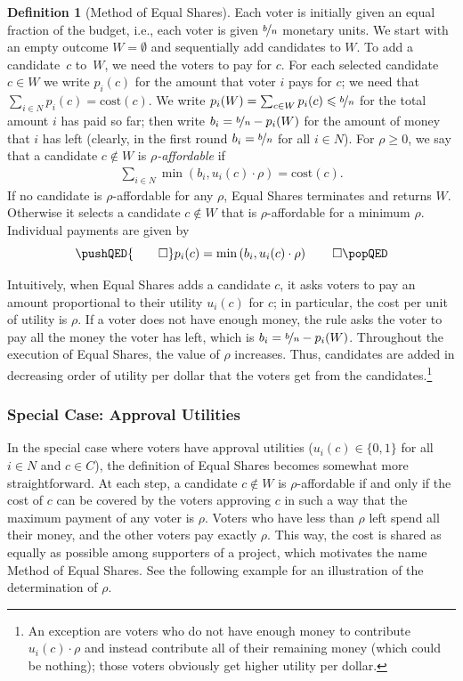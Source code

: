 \documentclass[10pt]{scrartcl}
\renewcommand*{\le}{\leqslant}
\renewcommand*{\ge}{\geqslant}
\newcommand{\cost}{{{\mathrm{cost}}}}
\theoremstyle{definition}
\newtheorem{definition}{Definition}
\theoremstyle{plain}
\begin{document}
\begin{definition}[Method of Equal Shares]\label{def:rulex}
	Each voter is initially given an equal fraction of the budget, i.e., each voter is given $\nicefrac{b}{n}$ monetary units. 
	We start with an empty outcome $W = \emptyset$ and sequentially add candidates to $W$. To add a candidate~$c$ to~$W$, we need the voters to pay for $c$. For each selected candidate $c \in W$ we write $p_i(c)$ for the amount that voter $i$ pays for $c$; we need that $\sum_{i \in N} p_i(c) = \cost(c)$. We write $p_i(W) = \sum_{c \in W} p_i(c) \le \nicefrac{b}{n}$ for the total amount $i$ has paid so far; then write $b_i = \nicefrac{b}{n} - p_i(W)$ for the amount of money that $i$ has left (clearly, in the first round $b_i = \nicefrac{b}{n}$ for all $i \in N$). For $\rho \ge 0$, we say that a candidate $c \not\in W$ is \emph{$\rho$-affordable} if
	\begin{align*}
		\sum_{i \in N} \min\left( b_i , u_i(c) \cdot \rho \right) = \cost(c) \text{.}
	\end{align*}
	If no candidate is $\rho$-affordable for any $\rho$, Equal Shares terminates and returns $W$. Otherwise it selects a candidate $c\not\in W$ that is $\rho$-affordable for a minimum $\rho$. 
	Individual payments are given by
	\[
	\pushQED{\qed} 
	p_i(c) = \min\left( b_i, u_i(c)\cdot \rho \right) 
	\qedhere
	\popQED
	\]
\end{definition}

Intuitively, when Equal Shares adds a candidate $c$, it asks voters to pay an amount proportional to their utility $u_i(c)$ for $c$; in particular, the cost per unit of utility is $\rho$. If a voter does not have enough money, the rule asks the voter to pay all the money the voter has left, which is $b_i = \nicefrac{b}{n} - p_i(W)$. Throughout the execution of Equal Shares, the value of $\rho$ increases. Thus, candidates are added in decreasing order of utility per dollar that the voters get from the candidates.\footnote{An exception are voters who do not have enough money to contribute $u_i(c) \cdot \rho$ and instead contribute all of their remaining money (which could be nothing); those voters obviously get higher utility per dollar.}

\subsubsection*{Special Case: Approval Utilities}

In the special case where voters have approval utilities ($u_i(c) \in \{0,1\}$ for all $i \in N$ and $c \in C$), the definition of Equal Shares becomes somewhat more straightforward. At each step, a candidate $c \not\in W$ is $\rho$-affordable if and only if the cost of $c$ can be covered by the voters approving $c$ in such a way that the maximum payment of any voter is $\rho$. Voters who have less than $\rho$ left spend all their money, and the other voters pay exactly $\rho$. This way, the cost is shared as equally as possible among supporters of a project, which motivates the name Method of Equal Shares. See the following example for an illustration of the determination of $\rho$.
\end{document}
